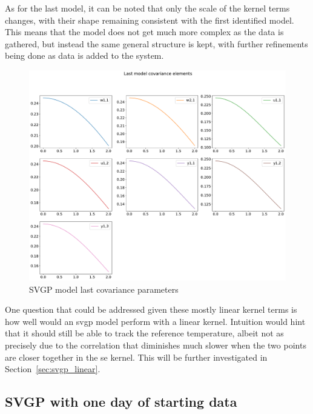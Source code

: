 As for the last model, it can be noted that only the scale of the kernel terms
changes, with their shape remaining consistent with the first identified model.
This means that the model does not get much more complex as the data is
gathered, but instead the same general structure is kept, with further
refinements being done as data is added to the system.

\clearpage

\begin{figure}[ht]
    \centering
    \includegraphics[width =
    \textwidth]{Plots/1_SVGP_480pts_inf_window_12_averageYear_last_covariance.pdf}
    \caption{SVGP model last covariance parameters}
    \label{fig:SVGP_last_covariance}
\end{figure}

One question that could be addressed given these mostly linear kernel terms is
how well would an \acrshort{svgp} model perform with a linear kernel.
Intuition would hint that it should still be able to track the reference
temperature, albeit not as precisely due to the correlation that diminishes much
slower when the two points are closer together in the \acrshort{se} kernel. This
will be further investigated in Section~\ref{sec:svgp_linear}.

\clearpage

\subsection{SVGP with one day of starting data}\label{sec:svgp_96pts}

